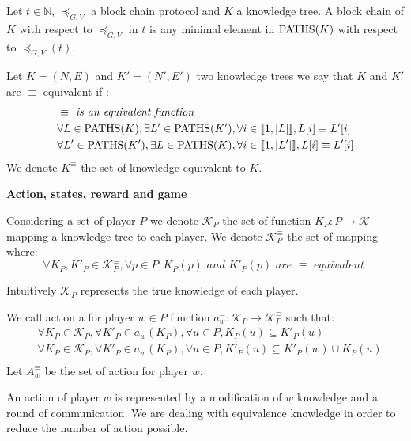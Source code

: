 \begin{mydef}
Let $t \in \mathbb N$, $\preceq_{G,V}$ a block chain protocol and $K$ a knowledge tree. 
A block chain of $K$ with respect to $\preceq_{G,V}$ in $t$ is any minimal element in $\text{PATHS}(K)$ with respect to $\preceq_{G,V}(t)$.
\end{mydef}

\begin{mydef}
	Let $K = (N,E)$ and $K'=(N',E')$ two knowledge trees we say that $K$ and $K'$ are $\equiv$ equivalent if :
	\begin{eqnarray*}
		& \equiv \textit{ is an equivalent function} \\
		& \forall L \in \text{PATHS}(K), \exists L' \in \text{PATHS}(K'), \forall i \in \llbracket 1,|L| \rrbracket, L[i] \equiv L'[i] \\
		& \forall L' \in \text{PATHS}(K'), \exists L \in \text{PATHS}(K), \forall i \in \llbracket 1,|L'| \rrbracket, L[i] \equiv L'[i] \\
	\end{eqnarray*}	
	We denote $K^{\equiv}$ the set of knowledge equivalent to $K$. 
\end{mydef}


\medskip
\noindent
\textbf{Action, states, reward and game}
\begin{mydef}
	Considering a set of player $P$ we denote $\mathcal{K}_P$ the set of function $K_P : P \rightarrow \mathcal{K}$ mapping a knowledge tree to each player. 
	We denote $\mathcal{K}^{\equiv}_P$ the set of mapping where:
	$$\forall K_P, K'_P \in \mathcal{K}^{\equiv}_P, \forall p \in P, K_P(p) \textit{ and } K'_P(p) \textit{ are } \equiv \textit{ equivalent } $$ 
\end{mydef}

Intuitively $\mathcal{K}_P$ represents the true knowledge of each player.

\begin{mydef}
	We call action a for player $w\in P$ function $a^\equiv_w: \mathcal{K}_P \rightarrow \mathcal{K}_P^{\equiv}$ such that: 
	\begin{eqnarray*}	
		&\forall K_P \in \mathcal{K}_P, \forall K'_P \in a_w(K_P),  \forall u \in P, K_P(u) \subseteq K'_P(u)  \\
		&\forall K_P \in \mathcal{K}_P, \forall K'_P \in a_w(K_P), \forall u \in P, K'_P(u) \subseteq K'_P(w) \cup K_P(u)  \\
	\end{eqnarray*}
	Let $A^\equiv_w$ be the set of action for player $w$.
\end{mydef}
An action of player $w$ is represented by a modification of $w$ knowledge and a round of communication. We are dealing with equivalence knowledge in order to reduce the number of action possible.

